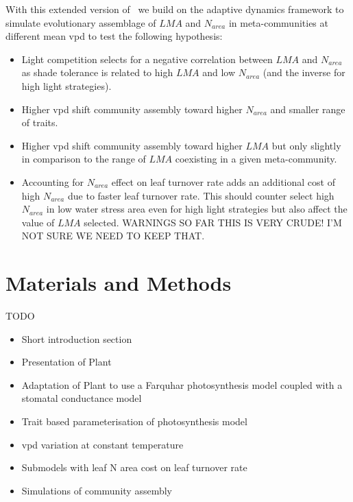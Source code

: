 \documentclass[a4paper,11pt]{article}
\begin{document}
With this extended version of \plant\ we build on the adaptive dynamics framework to simulate evolutionary assemblage of $LMA$ and $N_{area}$ in meta-communities at different mean vpd to test the following hypothesis:  
 
\begin{itemize}

\item Light competition selects for a negative correlation between $LMA$ and $N_{area}$ as shade tolerance is related to high $LMA$ and low $N_{area}$ (and the inverse for high light strategies).

\item Higher vpd shift community assembly toward higher $N_{area}$ and smaller range of traits.

\item Higher vpd shift community assembly toward higher $LMA$ but only slightly in comparison to the range of $LMA$ coexisting in a given meta-community.

\item Accounting for $N_{area}$ effect on leaf turnover rate adds an
  additional cost of high $N_{area}$ due to faster leaf turnover
  rate. This should counter select high $N_{area}$ in low water stress
  area even for high light strategies but also affect the value of
  $LMA$ selected. WARNINGS SO FAR THIS IS VERY CRUDE! I'M NOT SURE WE
  NEED TO KEEP THAT.

\end{itemize}


\section{Materials and Methods}

TODO

\begin{itemize}

\item Short introduction section
  
\item Presentation of Plant

\item Adaptation of Plant to use a Farquhar photosynthesis model coupled with a stomatal conductance model

\item Trait based parameterisation of photosynthesis model

\item vpd variation at constant temperature

\item Submodels with leaf N area cost on leaf turnover rate  
  
\item Simulations of community assembly 

\end{itemize}
\end{document}
